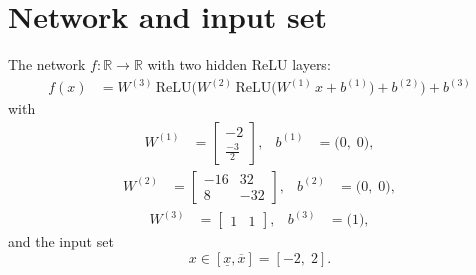 \documentclass[11pt]{article}
\begin{document}
\section{Network and input set}
The network $f:\mathbb{R} \to \mathbb{R}$ with two hidden ReLU layers:
\begin{align*}
f(x) &= W^{(3)}\,\mathrm{ReLU}\bigl(W^{(2)}\,\mathrm{ReLU}\bigl(W^{(1)}\,x + b^{(1)}\bigr) + b^{(2)}\bigr) + b^{(3)}
\end{align*}
with
\begin{align*}
W^{(1)} &= \begin{bmatrix}
-2 \\
\frac{-3}{2}
\end{bmatrix}, & b^{(1)} &= \bigl(0,\; 0\bigr),
\end{align*}
\begin{align*}
W^{(2)} &= \begin{bmatrix}
-16 & 32 \\
8 & -32
\end{bmatrix}, & b^{(2)} &= \bigl(0,\; 0\bigr),
\end{align*}
\begin{align*}
W^{(3)} &= \begin{bmatrix}
1 & 1
\end{bmatrix}, & b^{(3)} &= \bigl(1\bigr),
\end{align*}
and the input set
\begin{equation*}
 x \in [\underline{x}, \overline{x}] = [-2,\; 2].
\end{equation*}
\end{document}
